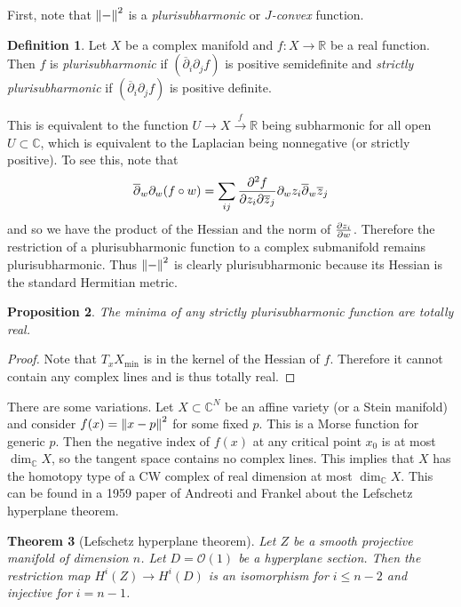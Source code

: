 \documentclass[leqno, openany]{memoir}
\newtheorem{thm}{Theorem}[section]
\newtheorem{prop}[thm]{Proposition}
\theoremstyle{definition}
\newtheorem{defn}[thm]{Definition}
\theoremstyle{remark}
\theoremstyle{plain}
\theoremstyle{definition}
\theoremstyle{remark}
\newcommand{\R}{\mathbb{R}}
\newcommand{\C}{\mathbb{C}}
\newcommand{\mc}[1]{\mathcal{#1}}
\newcommand{\ol}[1]{\overline{#1}}
\begin{document}
First, note that $\norm{-}^2$ is a \textit{plurisubharmonic} or
\textit{$J$-convex} function.

\begin{defn} Let $X$ be a complex manifold and $f \colon X \to \R$ be a real
    function. Then $f$ is \textit{plurisubharmonic} if $( \ol{\partial}_i
    \partial_j f )$ is positive semidefinite and \textit{strictly
    plurisubharmonic} if $(\ol{\partial}_i \partial_j f)$ is positive definite.
\end{defn}

This is equivalent to the function $U \to X \xrightarrow{f} \R$ being
subharmonic for all open $U \subset \C$, which is equivalent to the Laplacian
being nonnegative (or strictly positive). To see this, note that \[
\ol{\partial}_w \partial_w (f \circ w) = \sum_{ij} \pdv[2]{f}{z_i}{\ol{z}_j}
\partial_w z_i \ol{\partial}_w \ol{z}_j \] and so we have the product of the
Hessian and the norm of $\pdv{z_i}{w}$. Therefore the restriction of a
plurisubharmonic function to a complex submanifold remains plurisubharmonic.
Thus $\norm{-}^2$ is clearly plurisubharmonic because its Hessian is the
standard Hermitian metric.

\begin{prop} The minima of any strictly plurisubharmonic function are totally
real.  \end{prop}

\begin{proof} Note that $T_x X_{\min}$ is in the kernel of the Hessian of $f$.
Therefore it cannot contain any complex lines and is thus totally real.
\end{proof}

There are some variations. Let $X \subset \C^N$ be an affine variety (or a
Stein manifold) and consider $f(x) = \norm{x-p}^2$ for some fixed $p$. This is
a Morse function for generic $p$. Then the negative index of $f(x)$ at any
critical point $x_0$ is at most $\dim_{\C} X$, so the tangent space contains no
complex lines. This implies that $X$ has the homotopy type of a CW complex of
real dimension at most $\dim_{\C} X$. This can be found in a 1959 paper of
Andreoti and Frankel about the Lefschetz hyperplane theorem.

\begin{thm}[Lefschetz hyperplane theorem] Let $Z$ be a smooth projective
    manifold of dimension $n$. Let $D = \mc{O}(1)$ be a hyperplane section.
    Then the restriction map $H^i(Z) \to H^i(D)$ is an isomorphism for $i \leq
    n-2$ and injective for $i = n-1$.  \end{thm}
\end{document}
